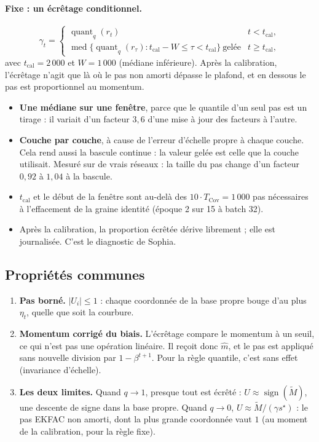 \documentclass[11pt,a4paper]{article}
\newcommand{\Mt}{\widetilde{M}}
\newcommand{\mh}{\hat m}
\DeclareMathOperator{\sign}{sign}
\DeclareMathOperator{\med}{med}
\begin{document}
\paragraph{Fixe : un écrêtage conditionnel.}
\[
  \gamma_t =
  \begin{cases}
    \operatorname{quant}_q(r_t) & t < t_\text{cal}, \\[3pt]
    \med\bigl\{\operatorname{quant}_q(r_\tau) : t_\text{cal} - W \le \tau < t_\text{cal}\bigr\}
      \ \text{gelée} & t \ge t_\text{cal},
  \end{cases}
\]
avec $t_\text{cal} = 2\,000$ et $W = 1\,000$ (médiane inférieure). Après la calibration, l'écrêtage
n'agit que là où le pas non amorti dépasse le plafond, et en dessous le pas est proportionnel au
momentum.
\begin{itemize}
  \item \textbf{Une médiane sur une fenêtre}, parce que le quantile d'un seul pas est un tirage :
        il variait d'un facteur $3{,}6$ d'une mise à jour des facteurs à l'autre.
  \item \textbf{Couche par couche}, à cause de l'erreur d'échelle propre à chaque couche. Cela rend
        aussi la bascule continue : la valeur gelée est celle que la couche utilisait. Mesuré sur de
        vrais réseaux : la taille du pas change d'un facteur $0{,}92$ à $1{,}04$ à la bascule.
  \item $t_\text{cal}$ et le début de la fenêtre sont au-delà des $10\cdot T_\text{Cov} = 1\,000$ pas
        nécessaires à l'effacement de la graine identité (époque 2 sur 15 à batch 32).
  \item Après la calibration, la proportion écrêtée dérive librement ; elle est journalisée. C'est le
        diagnostic de Sophia.
\end{itemize}

\subsection{Propriétés communes}

\begin{enumerate}
  \item \textbf{Pas borné.} $|U_i| \le 1$ : chaque coordonnée de la base propre bouge d'au plus
        $\eta_t$, quelle que soit la courbure.
  \item \textbf{Momentum corrigé du biais.} L'écrêtage compare le momentum à un seuil, ce qui n'est
        pas une opération linéaire. Il reçoit donc $\mh$, et le pas est appliqué sans nouvelle
        division par $1-\beta^{t+1}$. Pour la règle quantile, c'est sans effet (invariance d'échelle).
  \item \textbf{Les deux limites.} Quand $q \to 1$, presque tout est écrêté : $U \approx \sign(\Mt)$,
        une descente de signe dans la base propre. Quand $q \to 0$, $U \approx \Mt/(\gamma s^\star)$ :
        le pas EKFAC non amorti, dont la plus grande coordonnée vaut $1$ (au moment de la
        calibration, pour la règle fixe).
\end{enumerate}
\end{document}

